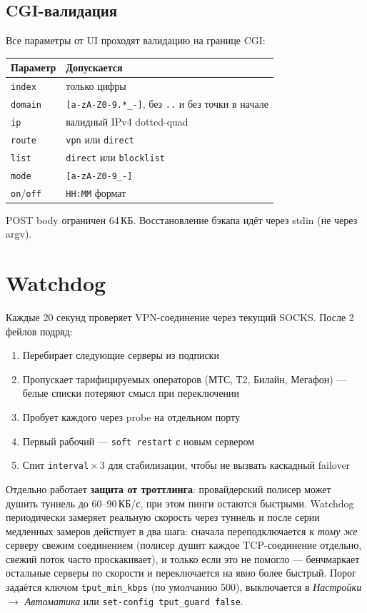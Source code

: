 \documentclass[11pt,a4paper]{article}
\begin{document}
\subsection{CGI-валидация}

Все параметры от UI проходят валидацию на границе CGI:

\begin{tabularx}{\textwidth}{l X}
\toprule
\textbf{Параметр} & \textbf{Допускается} \\
\midrule
\texttt{index} & только цифры \\
\texttt{domain} & \texttt{[a-zA-Z0-9.*\_-]}, без \texttt{..} и без точки в начале \\
\texttt{ip} & валидный IPv4 dotted-quad \\
\texttt{route} & \texttt{vpn} или \texttt{direct} \\
\texttt{list} & \texttt{direct} или \texttt{blocklist} \\
\texttt{mode} & \texttt{[a-zA-Z0-9\_-]} \\
\texttt{on}/\texttt{off} & \texttt{HH:MM} формат \\
\bottomrule
\end{tabularx}

POST body ограничен 64\,КБ. Восстановление бэкапа идёт через stdin (не через argv).

\section{Watchdog}

Каждые 20 секунд проверяет VPN-соединение через текущий SOCKS. После 2 фейлов подряд:

\begin{enumerate}
\item Перебирает следующие серверы из подписки
\item Пропускает тарифицируемых операторов (МТС, Т2, Билайн, Мегафон) — белые списки потеряют смысл при переключении
\item Пробует каждого через probe на отдельном порту
\item Первый рабочий — \texttt{soft restart} с новым сервером
\item Спит \texttt{interval}\,×\,3 для стабилизации, чтобы не вызвать каскадный failover
\end{enumerate}

Отдельно работает \textbf{защита от троттлинга}: провайдерский полисер может душить туннель до 60--90\,КБ/с, при этом пинги остаются быстрыми. Watchdog периодически замеряет реальную скорость через туннель и после серии медленных замеров действует в два шага: сначала переподключается к \emph{тому же} серверу свежим соединением (полисер душит каждое TCP-соединение отдельно, свежий поток часто проскакивает), и только если это не помогло --- бенчмаркает остальные серверы по скорости и переключается на явно более быстрый. Порог задаётся ключом \texttt{tput\_min\_kbps} (по умолчанию 500), выключается в \emph{Настройки $\rightarrow$ Автоматика} или \texttt{set-config tput\_guard false}.
\end{document}
